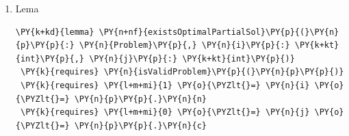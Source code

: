 \begin{sloppypar}
\begin{enumerate}
\begin{Verbatim}[commandchars=\\\{\}]
    \PY{k}{assert} \PY{n}{gain}\PY{p}{(}\PY{n}{p}\PY{p}{,} \PY{n}{s}\PY{p}{)} \PY{o}{==} \PY{n}{gain}\PY{p}{(}\PY{n}{p}\PY{p}{,} \PY{n}{solution}\PY{p}{)} \PY{o}{\PYZlt{}} \PY{n}{gain}\PY{p}{(}\PY{n}{p}\PY{p}{,} \PY{n}{x}\PY{p}{)}\PY{p}{;}
    \PY{k}{assert} \PY{n}{gain}\PY{p}{(}\PY{n}{p}\PY{p}{,} \PY{n}{x1}\PY{p}{)} \PY{o}{\PYZgt{}} \PY{n}{gain}\PY{p}{(}\PY{n}{p}\PY{p}{,} \PY{n}{solution}\PY{p}{)}\PY{p}{;}
    \PY{k}{assert} \PY{n}{isPartialSolution}\PY{p}{(}\PY{n}{p}\PY{p}{,} \PY{n}{x}\PY{p}{,} \PY{n}{i}\PY{p}{,} \PY{n}{j}\PY{p}{)}\PY{p}{;}
    \PY{k}{assert} \PY{n}{x}\PY{p}{[}\PY{n}{i} \PY{o}{\PYZhy{}} \PY{l+m+mi}{1}\PY{p}{]} \PY{o}{==} \PY{l+m+mi}{0}\PY{p}{;}
    \PY{n}{computeWeightAdd0}\PY{p}{(}\PY{n}{p}\PY{p}{,} \PY{n}{x}\PY{p}{,} \PY{o}{|}\PY{n}{x}\PY{o}{|} \PY{o}{\PYZhy{}} \PY{l+m+mi}{2}\PY{p}{)}\PY{p}{;}
    \PY{k}{assert} \PY{n}{weight}\PY{p}{(}\PY{n}{p}\PY{p}{,} \PY{n}{x}\PY{p}{)} \PY{o}{==} \PY{n}{weight}\PY{p}{(}\PY{n}{p}\PY{p}{,} \PY{n}{x1}\PY{p}{)}\PY{p}{;}
    \PY{k}{assert} \PY{n}{isPartialSolution}\PY{p}{(}\PY{n}{p}\PY{p}{,} \PY{n}{x1}\PY{p}{,} \PY{n}{i} \PY{o}{\PYZhy{}} \PY{l+m+mi}{1}\PY{p}{,} \PY{n}{j}\PY{p}{)}\PY{p}{;}
    \PY{k}{assert} \PY{err}{!}\PY{n}{isOptimalPartialSolution}\PY{p}{(}\PY{n}{p}\PY{p}{,} \PY{n}{solution}\PY{p}{,} \PY{n}{i} \PY{o}{\PYZhy{}} \PY{l+m+mi}{1}\PY{p}{,} \PY{n}{j}\PY{p}{)}\PY{p}{;}
    \PY{k}{assert} \PY{k+kc}{false}\PY{p}{;}
  \PY{p}{\PYZcb{}}
\PY{p}{\PYZcb{}}
\end{Verbatim}
     Este o altă lemă demonstrată folosind reducerea la absurd, de această dată pentru cazul în care greutatea obiectului depășește capacitatea $j$. Pornind de la premiza că soluția $solution + [0]$ nu este optimă pentru subproblema ($i, j$), înseamnă că există o altă soluție mai bună. Pentru a demonstra optimalitatea soluției a fost nevoie să arăt că eliminând ultimul element (corespunzător obiectului $i$) se ajunge la contrazicerea precondiției că avem o soluție optimă pentru ($i - 1, j$).
     \item Lema 
     \begin{Verbatim}[commandchars=\\\{\}]
\PY{k+kd}{lemma} \PY{n+nf}{existsOptimalPartialSol}\PY{p}{(}\PY{n}{p}\PY{p}{:} \PY{n}{Problem}\PY{p}{,} \PY{n}{i}\PY{p}{:} \PY{k+kt}{int}\PY{p}{,} \PY{n}{j}\PY{p}{:} \PY{k+kt}{int}\PY{p}{)} 
 \PY{k}{requires} \PY{n}{isValidProblem}\PY{p}{(}\PY{n}{p}\PY{p}{)}
 \PY{k}{requires} \PY{l+m+mi}{1} \PY{o}{\PYZlt{}=} \PY{n}{i} \PY{o}{\PYZlt{}=} \PY{n}{p}\PY{p}{.}\PY{n}{n}
 \PY{k}{requires} \PY{l+m+mi}{0} \PY{o}{\PYZlt{}=} \PY{n}{j} \PY{o}{\PYZlt{}=} \PY{n}{p}\PY{p}{.}\PY{n}{c}

\end{Verbatim}
\end{enumerate}
\end{sloppypar}
